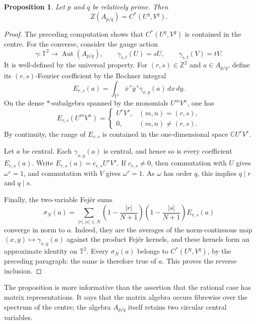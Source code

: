 \documentclass{book}
\newtheorem{proposition}[definition]{Proposition}
\begin{document}
\begin{proposition}\label{prop:RationalRotationCentre}
  Let \(p\) and \(q\) be relatively prime.  Then
  \[
    Z(A_{p/q})=C^*(U^q,V^q).
  \]
\end{proposition}

\begin{proof}
  The preceding computation shows that \(C^*(U^q,V^q)\) is contained in the
  centre.  For the converse, consider the gauge action
  \[
    \gamma\colon\mathbb T^2\longrightarrow\operatorname{Aut}(A_{p/q}),
    \qquad
    \gamma_{s,t}(U)=sU,
    \qquad \gamma_{s,t}(V)=tV.
  \]
  It is well-defined by the universal property.  For \((r,s)\in\mathbb Z^2\)
  and \(a\in A_{p/q}\), define its \((r,s)\)-Fourier coefficient by the
  Bochner integral
  \[
    E_{r,s}(a)=\int_{\mathbb T^2}\overline{x}^{\,r}\overline{y}^{\,s}
       \gamma_{x,y}(a)\,dx\,dy.
  \]
  On the dense \(*\)-subalgebra spanned by the monomials \(U^mV^n\), one has
  \[
    E_{r,s}(U^mV^n)=
    \begin{cases}
      U^rV^s,&(m,n)=(r,s),\\
      0,&(m,n)\neq(r,s).
    \end{cases}
  \]
  By continuity, the range of \(E_{r,s}\) is contained in the
  one-dimensional space \(\mathbb C U^rV^s\).

  Let \(a\) be central.  Each \(\gamma_{x,y}(a)\) is central, and hence so
  is every coefficient \(E_{r,s}(a)\).  Write
  \(E_{r,s}(a)=c_{r,s}U^rV^s\).  If \(c_{r,s}\neq0\), then commutation with
  \(U\) gives \(\omega^s=1\), and commutation with \(V\) gives
  \(\omega^r=1\).  As \(\omega\) has order \(q\), this implies
  \(q\mid r\) and \(q\mid s\).

  Finally, the two-variable Fej\'er sums
  \[
    \sigma_N(a)=
      \sum_{|r|,|s|\leq N}
      \left(1-\frac{|r|}{N+1}\right)
      \left(1-\frac{|s|}{N+1}\right)E_{r,s}(a)
  \]
  converge in norm to \(a\).  Indeed, they are the averages of the
  norm-continuous map \((x,y)\mapsto\gamma_{x,y}(a)\) against the product
  Fej\'er kernels, and these kernels form an approximate identity on
  \(\mathbb T^2\).  Every \(\sigma_N(a)\) belongs to
  \(C^*(U^q,V^q)\), by the preceding paragraph; the same is therefore true
  of \(a\).  This proves the reverse inclusion.
\end{proof}

The proposition is more informative than the assertion that the rational
case has matrix representations.  It says that the matrix algebra occurs
fibrewise over the spectrum of the centre; the algebra \(A_{p/q}\) itself
retains two circular central variables.
\end{document}
